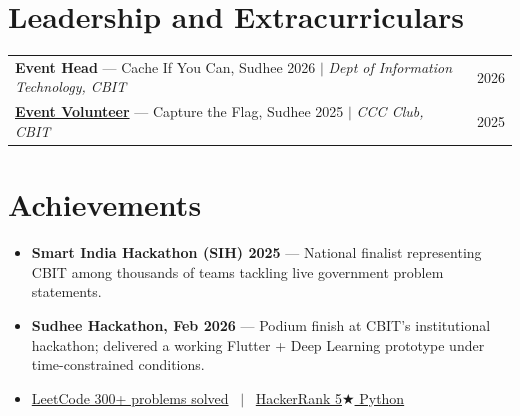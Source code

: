 \documentclass[a4paper,10.5pt]{article}
\begin{document}
\section{Leadership and Extracurriculars}
\vspace{1pt}
\begin{tabularx}{\linewidth}{@{}l r@{}}
\textbf{Event Head} --- Cache If You Can, Sudhee 2026 $|$ \textit{Dept of Information Technology, CBIT} & \hfill 2026 \\[4pt]
\href{https://drive.google.com/file/d/1yupQx853bTCgPQpJUgdcno5PdC6kmpVC/view?usp=share_link}{\textbf{Event Volunteer}} --- Capture the Flag, Sudhee 2025 $|$ \textit{CCC Club, CBIT} & \hfill 2025 \\
\end{tabularx}
\section{Achievements}
\vspace{1pt}
\begin{itemize}[nosep, leftmargin=1.5em, itemsep=2pt]
  \item[--] \textbf{Smart India Hackathon (SIH) 2025} --- National finalist representing CBIT among thousands of teams tackling live government problem statements.
  \item[--] \textbf{Sudhee Hackathon, Feb 2026} --- Podium finish at CBIT's institutional hackathon; delivered a working Flutter + Deep Learning prototype under time-constrained conditions.
  \item[--] \href{https://leetcode.com/u/SESH_MANUVARTHI/}{LeetCode 300+ problems solved} \ $|$ \ \href{https://www.hackerrank.com/profile/seshmanuvarthi27}{HackerRank 5$\bigstar$ Python}
\end{itemize}


\end{document}
